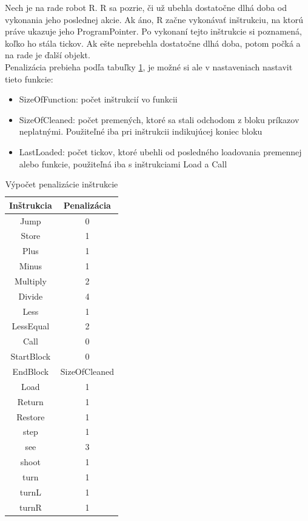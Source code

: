 Nech je na rade robot R. R sa pozrie, či už ubehla dostatočne dlhá doba od vykonania jeho poslednej akcie. Ak áno, R začne vykonávať inštrukciu, na ktorú práve ukazuje jeho ProgramPointer. Po vykonaní tejto inštrukcie si poznamená, koľko ho stála tickov. Ak ešte neprebehla dostatočne dlhá doba, potom počká a na rade je ďalší objekt. \\
Penalizácia prebieha podľa tabuľky \ref{penal}, je možné si ale v nastaveniach nastavit tieto funkcie:
\begin{itemize}
\item SizeOfFunction: počet inštrukcií vo funkcii
\item SizeOfCleaned: počet premených, ktoré sa stali odchodom z bloku príkazov neplatnými. Použiteľné iba pri inštrukcii indikujúcej koniec bloku
\item LastLoaded: počet tickov, ktoré ubehli od posledného loadovania premennej alebo funkcie, použiteľná iba s inštrukciami Load a Call
\end{itemize}
\begin{table}[ht]
\centering
\caption{Výpočet penalizácie inštrukcie}
\begin{tabular}{|c | c |}
\hline
Inštrukcia & Penalizácia \\
\hline
Jump & 0\\
Store & 1 \\
Plus & 1 \\
Minus & 1 \\
Multiply & 2 \\
Divide & 4 \\
Less & 1 \\
LessEqual & 2 \\ %
Call &  0 \\
StartBlock & 0 \\ %
EndBlock &  SizeOfCleaned \\
Load & 1\\
Return & 1 \\
Restore & 1 \\
\hline
step & 1\\
see & 3\\
shoot & 1\\
turn & 1\\ 
turnL & 1\\
turnR & 1\\
\hline
\end {tabular}
\label{penal}
\end{table}


